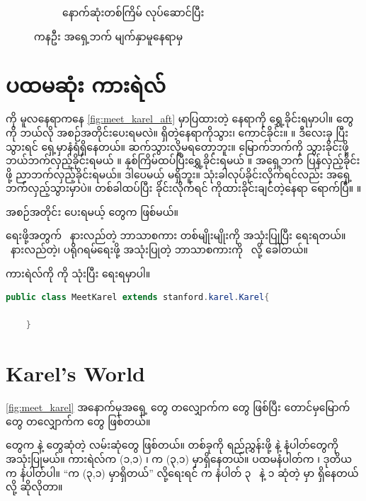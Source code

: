 \begin{sloppypar}
\begin{figure}[tbh!]
\begin{subfigure}[t]{0.4\textwidth}
        \caption{ နောက်ဆုံးတစ်ကြိမ် လုပ်ဆောင်ပြီး}
    \end{subfigure}
    \caption{ကနဦး အရှေ့ဘက် မျက်နှာမူနေရာမှ}
    \label{fig:bef_and_after_turnLeft}
\end{figure}



\section{ပထမဆုံး ကားရဲလ် \mmprogram}
\enbeeper ကို မူလနေရာကနေ \Fig \vref*{fig:meet_karel_aft} မှာပြထားတဲ့ နေရာကို ရွှေ့ခိုင်းရမှာပါ။ \mmcommand တွေကို ဘယ်လို အစဉ်အတိုင်းပေးရမလဲ။ \mmbeeper ရှိတဲ့နေရာကိုသွား၊ \mmbeeper ကောင်ခိုင်း။ ။ ဒီ\mmcommand လေးခု ပြီးသွားရင် ရှေ့မှာနံရံရှိနေတယ်။ ဆက်သွားလို့မရတော့ဘူး။ မြောက်ဘက်ကို သွားခိုင်းဖို့ ဘယ်ဘက်လှည့်ခိုင်းရမယ် ။ နှစ်ကြိမ်ထပ်ပြီးရွှေ့ခိုင်းရမယ် ။ အရှေ့ဘက် ပြန်လှည့်ခိုင်းဖို့ ညာဘက်လှည့်ခိုင်းရမယ်။ ဒါပေမယ့်  \mmcommand မရှိဘူး။  သုံးခါလုပ်ခိုင်းလိုက်ရင်လည်း အရှေ့ဘက်လှည့်သွားမှာပဲ။ တစ်ခါထပ်ပြီး  ခိုင်းလိုက်ရင် \mmbeeper ကိုထားခိုင်းချင်တဲ့နေရာ ရောက်ပြီ။ ။ 

အစဉ်အတိုင်း ပေးရမယ့် \mmcommand တွေက  ဖြစ်မယ်။  \mmprogram 

\mmprogram ရေးဖို့အတွက် \encomputer\ နားလည်တဲ့ ဘာသာစကား တစ်မျိုးမျိုးကို အသုံးပြုပြီး ရေးရတယ်။ \mmcomputer\ နားလည်တဲ့၊ \mmcomputer ပရိုဂရမ်ရေးဖို့ အသုံးပြုတဲ့ ဘာသာစကားကို \enPL\ လို့ ခေါ်တယ်။ 

ကားရဲလ်ကို \enJPL ကို သုံးပြီး \mmprogram ရေးရမှာပါ။

\begin{lstlisting}[language = Java, float]
    public class MeetKarel extends stanford.karel.Karel{
            
    }
\end{lstlisting}

\section{Karel's World}
\Fig \vref*{fig:meet_karel} 
အနောက်မှအရှေ့ \mmcorner တွေ တလျှောက်က \enstreet တွေ ဖြစ်ပြီး တောင်မှမြောက် \mmcorner တွေ တလျှောက်က \enavenue တွေ ဖြစ်တယ်။ 

\mmcorner တွေက \mmavenue နဲ့ \mmstreet တွေဆုံတဲ့ လမ်းဆုံတွေ ဖြစ်တယ်။ \mmcorner တစ်ခုကို ရည်ညွှန်းဖို့ \mmavenue နဲ့ \mmstreet နံပါတ်‌တွေကို အသုံးပြုမယ်။ ကားရဲလ်က (၁,၁) \mmcorner၊ \mmbeeper က (၃,၁) \mmcorner မှာရှိနေတယ်။ ပထမ‌‌နံပါတ်က \mmavenue ၊ ဒုတိယက \mmstreet နံပါတ်ပါ။ “\mmbeeper က (၃,၁) \mmcorner မှာရှိတယ်”  လို့ရေးရင် \mmbeeper က နံပါတ် ၃ \mmavenue\ နဲ့ ၁ \mmstreet ဆုံတဲ့ \mmcorner မှာ ရှိနေတယ်လို့ ဆိုလိုတာ။




\end{sloppypar}
